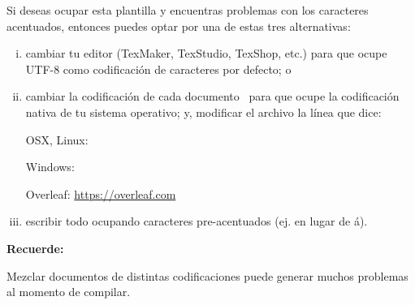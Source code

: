 Si deseas ocupar esta plantilla y encuentras problemas con los caracteres acentuados, entonces puedes optar por una de estas tres alternativas:
\begin{enumerate}[i)]
    \item cambiar tu editor (TexMaker, TexStudio, TexShop, etc.) para que ocupe UTF-8 como codificación de caracteres por defecto; o
    
    \item cambiar la codificación de cada documento  para que ocupe la codificación nativa de tu sistema operativo; y, modificar el archivo  la línea que dice:
    
    OSX, Linux: 

    Windows:    
    
    Overleaf:    \url{https://overleaf.com}
    
    \item escribir todo ocupando caracteres pre-acentuados (ej.  en lugar de á).
\end{enumerate}

\vspace{10mm}
\begin{framed}
    \noindent\textbf{Recuerde:} 
    
    \noindent Mezclar documentos de distintas codificaciones puede generar muchos problemas al momento de compilar.  
\end{framed}


